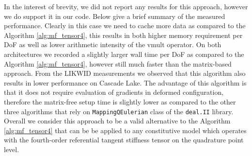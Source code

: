 \documentclass[AMA,STIX1COL]{WileyNJD-v2}
\begin{document}
{\color{red}
In the interest of brevity, we did not report any results for this approach,
however we do support it in our code.
Below give a brief summary of the measured performance.
Clearly in this case we need to cache more data as compared to the Algorithm \ref{alg:mf_tensor4}, this results in both higher memory requirement per DoF as well as lower arithmetic intensity of the vmult operator.
On both architectures we recorded a slightly larger wall time per DoF as compared to the Algorithm \ref{alg:mf_tensor4}, however still much faster than the matrix-based approach.
From the LIKWID measurements we observed that this algorithm also results in lower performance on Cascade Lake.
The advantage of this algorithm is that it does not require evaluation of gradients in deformed configuration, therefore the matrix-free setup time is slightly lower as compared to the other three algorithms that rely on \texttt{MappingQEulerian} class of the \texttt{deal.II} library.
Overall we consider this approach to be a valid alternative to the Algorithm \ref{alg:mf_tensor4}
that can be be applied to any constitutive model which operates with the fourth-order referential tangent stiffness tensor on the quadrature point level.
}

\ifijnme
%
\else

\fi


%
\end{document}

